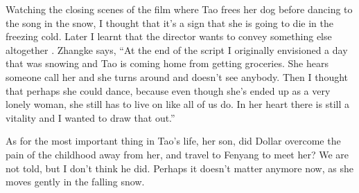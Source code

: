 \documentclass{article}
\begin{document}
Watching the closing scenes of the film where Tao frees her dog before
dancing to the song in the snow, I thought that it's a sign that she
is going to die in the freezing cold.  Later I learnt that the
director wants to convey something else altogether
\parencite{bib:6xz64ynw}.  Zhangke says, ``At the end of the script I
originally envisioned a day that was snowing and Tao is coming home
from getting groceries.  She hears someone call her and she turns
around and doesn’t see anybody.  Then I thought that perhaps she could
dance, because even though she’s ended up as a very lonely woman, she
still has to live on like all of us do.  In her heart there is still a
vitality and I wanted to draw that out.''

As for the most important thing in Tao's life, her son, did Dollar
overcome the pain of the childhood away from her, and travel to
Fenyang to meet her? We are not told, but I don't think he did.
Perhaps it doesn't matter anymore now, as she moves gently in the
falling snow.

\bibsection
\end{document}
